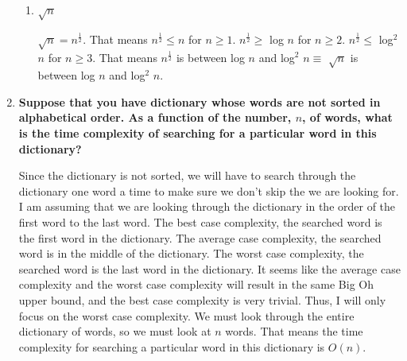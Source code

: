 \documentclass[10pt]{article}
\begin{document}
\begin{enumerate}
\begin{enumerate}
				\item $\sqrt{n}$
					
					\vspace{0.5cm}
					$\sqrt{n} = n^{\frac{1}{2}}$. That means $n^{\frac{1}{2}} \leq n$ for $n \geq 1$. $n^{\frac{1}{2}} \geq$ log $n$ for $n \geq 2$. $n^{\frac{1}{2}} \leq$ log$^2$ $n$ for $n \geq 3$. That means $n^{\frac{1}{2}}$ is between log $n$ and log$^2$ $n \equiv$ $\sqrt{n}$ is between log $n$ and log$^2$ $n$.
					\vspace{0.5cm}
			
			\end{enumerate}
		
		\setcounter{enumi}{17}
		\item \textbf{Suppose that you have dictionary whose words are not sorted in alphabetical order. As a function of the number, $n$, of words, what is the time complexity of searching for a particular word in this dictionary?}
			
			\vspace{0.5cm}
			Since the dictionary is not sorted, we will have to search through the dictionary one word a time to make sure we don't skip the we are looking for. I am assuming that we are looking through the dictionary in the order of the first word to the last word. The best case complexity, the searched word is the first word in the dictionary. The average case complexity, the searched word is in the middle of the dictionary. The worst case complexity, the searched word is the last word in the dictionary. It seems like the average case complexity and the worst case complexity will result in the same Big Oh upper bound, and the best case complexity is very trivial. Thus, I will only focus on the worst case complexity. We must look through the entire dictionary of words, so we must look at $n$ words. That means the time complexity for searching a particular word in this dictionary is $O(n)$.
	\end{enumerate}
\end{document}
